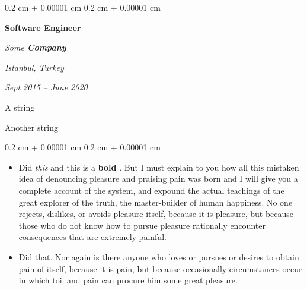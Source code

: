 \documentclass[10pt, letterpaper]{article}
\newenvironment{summary}{
    \begin{description}[
        topsep=0.10 cm,
        parsep=0.10 cm,
        partopsep=0pt,
        itemsep=0pt,
        leftmargin=0.4 cm + 10pt
    ]
}{
    \end{description}
} %
\newenvironment{highlights}{
    \begin{itemize}[
        topsep=0.10 cm,
        parsep=0.10 cm,
        partopsep=0pt,
        itemsep=0pt,
        leftmargin=0.4 cm + 10pt
    ]
}{
    \end{itemize}
} %
\newenvironment{onecolentry}{
    \begin{adjustwidth}{
        0.2 cm + 0.00001 cm
    }{
        0.2 cm + 0.00001 cm
    }
}{
    \end{adjustwidth}
} %
\newenvironment{twocolentry}[2][]{
    \onecolentry
    \def\secondColumn{#2}
    \setcolumnwidth{\fill, 4.5 cm}
    \begin{paracol}{2}
}{
    \switchcolumn \raggedleft \secondColumn
    \end{paracol}
    \endonecolentry
} %
\let\hrefWithoutArrow\href
\renewcommand{\href}[2]{\hrefWithoutArrow{#1}{\ifthenelse{\equal{#2}{}}{ }{#2 }\raisebox{.15ex}{\footnotesize \faExternalLink*}}}
\begin{document}
        \begin{twocolentry}{
        \textit{Istanbul, Turkey}    
            
        \textit{Sept 2015 – June 2020}}
            \textbf{Software Engineer}
            
            \textit{Some \textbf{Company}}
        \end{twocolentry}
            \begin{summary}
                \item A string
                \item Another string
            \end{summary}
        \vspace{0.10 cm}
        \begin{onecolentry}
            \begin{highlights}
                \item Did \textit{this} and this is a \textbf{bold} \href{https://example.com}{link}. But I must explain to you how all this mistaken idea of denouncing pleasure and praising pain was born and I will give you a complete account of the system, and expound the actual teachings of the great explorer of the truth, the master-builder of human happiness. No one rejects, dislikes, or avoids pleasure itself, because it is pleasure, but because those who do not know how to pursue pleasure rationally encounter consequences that are extremely painful.
                \item Did that. Nor again is there anyone who loves or pursues or desires to obtain pain of itself, because it is pain, but because occasionally circumstances occur in which toil and pain can procure him some great pleasure.
            \end{highlights}
        \end{onecolentry}


        \vspace{0.2 cm}
\end{document}
